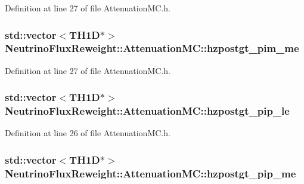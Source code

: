 Definition at line 27 of file Attenuation\-M\-C.\-h.

\hypertarget{class_neutrino_flux_reweight_1_1_attenuation_m_c_ada00bc8840f8c94bdf92796e7c87b103}{
\subsubsection[{hzpostgt\-\_\-pim\-\_\-me}]{\setlength{\rightskip}{0pt plus 5cm}std\-::vector$<$T\-H1\-D$\ast$$>$ Neutrino\-Flux\-Reweight\-::\-Attenuation\-M\-C\-::hzpostgt\-\_\-pim\-\_\-me}}\label{class_neutrino_flux_reweight_1_1_attenuation_m_c_ada00bc8840f8c94bdf92796e7c87b103}


Definition at line 27 of file Attenuation\-M\-C.\-h.

\hypertarget{class_neutrino_flux_reweight_1_1_attenuation_m_c_a96f19a370160ceee2c8bf61d93a34085}{
\subsubsection[{hzpostgt\-\_\-pip\-\_\-le}]{\setlength{\rightskip}{0pt plus 5cm}std\-::vector$<$T\-H1\-D$\ast$$>$ Neutrino\-Flux\-Reweight\-::\-Attenuation\-M\-C\-::hzpostgt\-\_\-pip\-\_\-le}}\label{class_neutrino_flux_reweight_1_1_attenuation_m_c_a96f19a370160ceee2c8bf61d93a34085}


Definition at line 26 of file Attenuation\-M\-C.\-h.

\hypertarget{class_neutrino_flux_reweight_1_1_attenuation_m_c_a4a4fe98dd8c926d1996b1bcf492b65cd}{
\subsubsection[{hzpostgt\-\_\-pip\-\_\-me}]{\setlength{\rightskip}{0pt plus 5cm}std\-::vector$<$T\-H1\-D$\ast$$>$ Neutrino\-Flux\-Reweight\-::\-Attenuation\-M\-C\-::hzpostgt\-\_\-pip\-\_\-me}}\label{class_neutrino_flux_reweight_1_1_attenuation_m_c_a4a4fe98dd8c926d1996b1bcf492b65cd}


